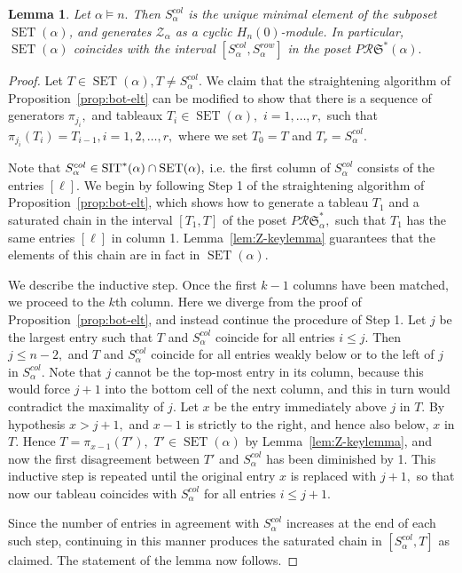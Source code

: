 \documentclass[12pt,letterpaper]{amsart}
\newtheorem{lemma}[theorem]{Lemma}
\theoremstyle{definition}
\newcommand{\rdI}{\mathcal{R}\mathfrak{S}^*}
\newcommand{\SET}{\ensuremath{\operatorname{SET}}} \newcommand{\NSET}{\ensuremath{\operatorname{NSET}}}\newcommand{\SRCT}{\ensuremath{\operatorname{SRCT}}}
\newcommand{\hn}{H_n(0)}
\begin{document}
\begin{lemma}\label{lem:Zcyclic} Let $\alpha \vDash n.$ Then $S^{col}_\alpha$ is the unique minimal element of the subposet $\SET(\alpha)$, and generates $\mathcal{Z}_\alpha$ as a cyclic 
$\hn$-module.  In particular, $\SET(\alpha)$ coincides with the interval $[S^{col}_\alpha, S^{row}_\alpha]$ in the poset $P\rdI(\alpha).$
\end{lemma}
\begin{proof}   Let $T\in \SET(\alpha), T\ne S^{col}_\alpha.$  We claim that the straightening algorithm of  Proposition~\ref{prop:bot-elt} can be modified to show that there is a sequence of generators $\pi_{j_i}, $ and tableaux $T_i\in \SET(\alpha),$ $i=1,\ldots, r,$  such that $\pi_{j_i}(T_{i})=T_{i-1}, i=1,2,\ldots ,r,$ where we set $T_{0}=T$ and $T_r=S^{col}_\alpha$. 

Note that $S^{col}_\alpha\in \SIT^*(\alpha)\cap\SET(\alpha),$ i.e. the first column of $S^{col}_\alpha$ consists of the entries $[\ell].$ We begin by following Step 1 of the straightening algorithm of  Proposition~\ref{prop:bot-elt}, which  shows how to generate a tableau $T_1$ and a saturated chain in the interval  $[T_1, T]$ of the poset $P\rdI_\alpha,$  such that $T_1$ has the same entries $[\ell]$ in column 1.  Lemma~\ref{lem:Z-keylemma} guarantees that the elements of this chain are in fact in $\SET(\alpha).$ 

We describe the inductive step. Once the first $k-1$ columns have been matched, we proceed to the $k$th column.  Here we  diverge from the proof of Proposition~\ref{prop:bot-elt}, and instead continue the procedure of Step 1. Let $j$ be the largest entry such that $T$ and $S^{col}_\alpha$ coincide for all entries $i\le j.$ 
Then $j\le n-2,$ and $T$ and $S^{col}_\alpha$ coincide for all entries weakly below or to the left of $j$ in $S^{col}_\alpha.$ 
 Note that $j$ cannot be the top-most entry in its column, because this would force $j+1$ into the bottom cell of the next column, and this in turn would contradict the maximality of $j.$  Let $x$ be the entry immediately above $j$ in $T.$  By hypothesis $x>j+1,$ and $x-1$ is strictly to the right, and hence also below, $x$ in $T.$  Hence $T=\pi_{x-1}(T'),$ $T'\in \SET(\alpha)$ by Lemma~\ref{lem:Z-keylemma}, and  now the first disagreement between $T'$ and $S^{col}_\alpha$ has been diminished by 1. This inductive step is repeated until the original entry $x$ is replaced with $j+1,$ so that now our tableau coincides with $S^{col}_\alpha$ for all entries $i\le j+1.$

Since the number of entries in agreement  with $S^{col}_\alpha$ increases at the end of each such step,  continuing in this manner produces the saturated chain in $[S^{col}_\alpha, T]$ as claimed.   
The statement of the lemma now follows.
\end{proof}
\end{document}
